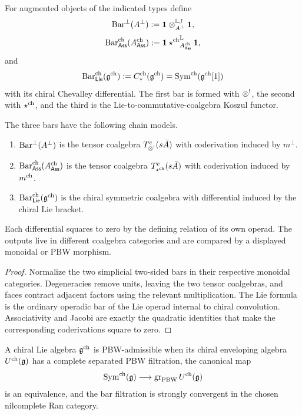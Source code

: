 \begin{definition}
For augmented objects of the indicated types define
\[
 \operatorname{Bar}^{\perp}(A^\perp)
   :=\mathbf{1}\otimes_{A^\perp}^{\mathbb L,!}\mathbf{1},
\]
\[
 \operatorname{Bar}^{\mathrm{ch}}_{\mathsf{Ass}}(A^{\mathrm{ch}}_{\mathsf{Ass}})
   :=\mathbf{1}\mathbin{\star^{\mathrm{ch}}}_{A^{\mathrm{ch}}_{\mathsf{Ass}}}^{\mathbb L}\mathbf{1},
\]
and
\[
 \operatorname{Bar}^{\mathrm{ch}}_{\mathsf{Lie}}(\mathfrak g^{\mathrm{ch}})
   :=C_*^{\mathrm{ch}}(\mathfrak g^{\mathrm{ch}})
   =\operatorname{Sym}^{\mathrm{ch}}(\mathfrak g^{\mathrm{ch}}[1])
\]
with its chiral Chevalley differential.  The first bar is formed with $\otimes^!$, the second with $\mathbin{\star^{\mathrm{ch}}}$, and the third is the Lie-to-commutative-coalgebra Koszul functor.
\end{definition}

\begin{theorem}
The three bars have the following chain models.
\begin{enumerate}
\item $\operatorname{Bar}^{\perp}(A^\perp)$ is the tensor coalgebra $T^c_{\otimes^!}(s\bar A)$ with coderivation induced by $m^\perp$.
\item $\operatorname{Bar}^{\mathrm{ch}}_{\mathsf{Ass}}(A^{\mathrm{ch}}_{\mathsf{Ass}})$ is the tensor coalgebra $T^c_{\mathbin{\star^{\mathrm{ch}}}}(s\bar A)$ with coderivation induced by $m^{\mathrm{ch}}$.
\item $\operatorname{Bar}^{\mathrm{ch}}_{\mathsf{Lie}}(\mathfrak g^{\mathrm{ch}})$ is the chiral symmetric coalgebra with differential induced by the chiral Lie bracket.
\end{enumerate}
Each differential squares to zero by the defining relation of its own operad.  The outputs live in different coalgebra categories and are compared by a displayed monoidal or PBW morphism.
\end{theorem}
\begin{proof}
Normalize the two simplicial two-sided bars in their respective monoidal categories.  Degeneracies remove units, leaving the two tensor coalgebras, and faces contract adjacent factors using the relevant multiplication.  The Lie formula is the ordinary operadic bar of the Lie operad internal to chiral convolution.  Associativity and Jacobi are exactly the quadratic identities that make the corresponding coderivations square to zero.
\end{proof}

\begin{definition}
A chiral Lie algebra $\mathfrak g^{\mathrm{ch}}$ is PBW-admissible when its chiral enveloping algebra $U^{\mathrm{ch}}(\mathfrak g)$ has a complete separated PBW filtration, the canonical map
\[
 \operatorname{Sym}^{\mathrm{ch}}(\mathfrak g)\longrightarrow\operatorname{gr}_{\mathrm{PBW}}U^{\mathrm{ch}}(\mathfrak g)
\]
is an equivalence, and the bar filtration is strongly convergent in the chosen nilcomplete Ran category.
\end{definition}

